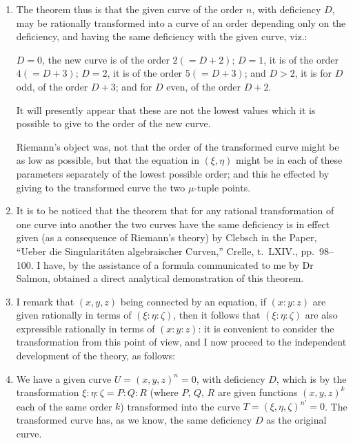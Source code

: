 \documentclass[12pt,a4paper]{article}
\theoremstyle{plain}
\theoremstyle{definition}
\theoremstyle{remark}
\begin{document}
\begin{enumerate}[label=\arabic*.]
Hence in every case the new curve has the same deficiency as the original curve.

\item The theorem thus is that the given curve of the order $n$, with deficiency $D$, may be rationally transformed into a curve of an order depending only on the deficiency, and having the same deficiency with the given curve, viz.:

$D = 0$, the new curve is of the order $2 (= D+2)$; $D = 1$, it is of the order $4 (= D+3)$; $D = 2$, it is of the order $5 (= D+3)$; and $D > 2$, it is for $D$ odd, of the order $D+3$; and for $D$ even, of the order $D+2$.

It will presently appear that these are not the lowest values which it is possible to give to the order of the new curve.

Riemann's object was, not that the order of the transformed curve might be as low as possible, but that the equation in $(\xi, \eta)$ might be in each of these parameters separately of the lowest possible order; and this he effected by giving to the transformed curve the two $\mu$-tuple points.

\item It is to be noticed that the theorem that for any rational transformation of one curve into another the two curves have the same deficiency is in effect given (as a consequence of Riemann's theory) by Clebsch in the Paper, ``Ueber die Singularit\'{a}ten algebraischer Curven,'' Crelle, t.~LXIV., pp.~98--100. I have, by the assistance of a formula communicated to me by Dr Salmon, obtained a direct analytical demonstration of this theorem.

\item I remark that $(x,y,z)$ being connected by an equation, if $(x:y:z)$ are given rationally in terms of $(\xi:\eta:\zeta)$, then it follows that $(\xi:\eta:\zeta)$ are also expressible rationally in terms of $(x:y:z)$: it is convenient to consider the transformation from this point of view, and I now proceed to the independent development of the theory, as follows:

\item We have a given curve $U = (x,y,z)^n = 0$, with deficiency $D$, which is by the transformation $\xi:\eta:\zeta = P:Q:R$ (where $P$, $Q$, $R$ are given functions $(x,y,z)^k$ each of the same order $k$) transformed into the curve $T = (\xi,\eta,\zeta)^{n'} = 0$. The transformed curve has, as we know, the same deficiency $D$ as the original curve.


\end{enumerate}
\end{document}
